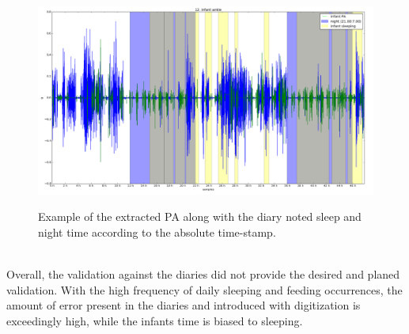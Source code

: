 \documentclass{article}
\begin{document}
{ \begin{figure}[h!]
\includegraphics[width=15cm, height=7cm]{12PA.png}
\caption{Example of the extracted PA along with the diary noted sleep and night time according to the absolute time-stamp.}
\end{figure}
\\Overall, the validation against the diaries did not provide the desired and planed validation. With the high frequency of daily sleeping and feeding occurrences, the amount of error present in the diaries and introduced with digitization is exceedingly high, while the infants time is biased to sleeping. 
}

\newpage
\end{document}
